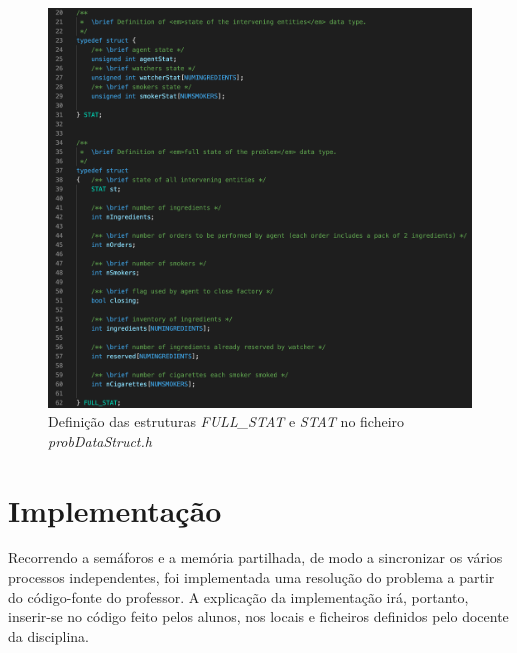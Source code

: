\documentclass[10pt,portuguese]{article}
\begin{document}
\begin{figure}[!h]
    \centering
    \includegraphics[width=\textwidth]{images/Problem/full_stat.png}
    \caption{Definição das estruturas \textit{FULL\_STAT} e \textit{STAT} no ficheiro \textit{probDataStruct.h}}
\end{figure}

\clearpage

\section{Implementação}

\par Recorrendo a semáforos e a memória partilhada, de modo a sincronizar os vários processos independentes, foi implementada uma resolução do problema a partir do código-fonte do professor. A explicação da implementação irá, portanto, inserir-se no código feito pelos alunos, nos locais e ficheiros definidos pelo docente da disciplina. 
\end{document}
